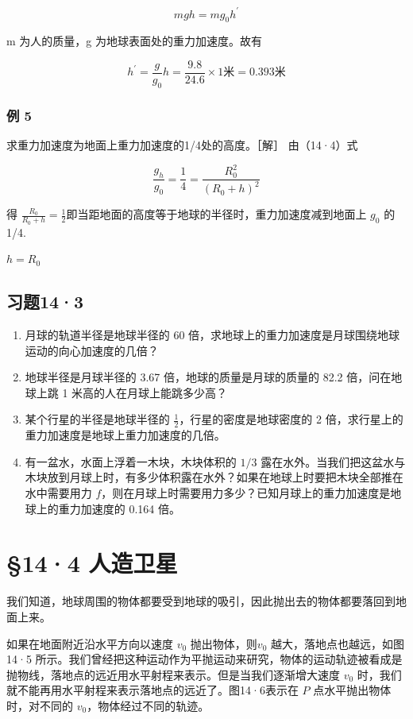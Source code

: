 \[
m g h = m g _ {0} h ^ {\prime}
\]

m 为人的质量，g 为地球表面处的重力加速度。故有

\[
h ^ {\prime} = \frac {g}{g _ {0}} h = \frac {9.8}{24.6} \times 1 \text{米} = 0.393 \text{米}
\]

\subsubsection{例 5}\label{ux4f8b-5-11}

求重力加速度为地面上重力加速度的1/4处的高度。［解］ 由（14·4）式

\[
\frac {g _ {h}}{g _ {0}} = \frac {1}{4} = \frac {R _ {0} ^ {2}}{(R _ {0} + h) ^ {2}}
\]

得
\(\frac{R_0}{R_0 + h} = \frac{1}{2}\)即当距地面的高度等于地球的半径时，重力加速度减到地面上
\(g_{0}\) 的1/4.

\(h = R_{0}\)

\subsection{习题14·3}\label{ux4e60ux9898143}

\begin{enumerate}
\def\labelenumi{\arabic{enumi}.}
\item
  月球的轨道半径是地球半径的 60
  倍，求地球上的重力加速度是月球围绕地球运动的向心加速度的几倍？
\item
  地球半径是月球半径的 3.67 倍，地球的质量是月球的质量的 82.2
  倍，问在地球上跳 1 米高的人在月球上能跳多少高？
\item
  某个行星的半径是地球半径的 \(\frac{1}{2}\)，行星的密度是地球密度的 2
  倍，求行星上的重力加速度是地球上重力加速度的几倍。
\item
  有一盆水，水面上浮着一木块，木块体积的 \(1/3\)
  露在水外。当我们把这盆水与木块放到月球上时，有多少体积露在水外？如果在地球上时要把木块全部推在水中需要用力
  \(f\)，则在月球上时需要用力多少？已知月球上的重力加速度是地球上的重力加速度的
  0.164 倍。
\end{enumerate}

\section{§14·4 人造卫星}\label{ux4ebaux9020ux536bux661f}

我们知道，地球周围的物体都要受到地球的吸引，因此抛出去的物体都要落回到地面上来。

如果在地面附近沿水平方向以速度 \(v_{0}\) 抛出物体，则\(v_{0}\)
越大，落地点也越远，如图 14·5
所示。我们曾经把这种运动作为平抛运动来研究，物体的运动轨迹被看成是抛物线，落地点的远近用水平射程来表示。但是当我们逐渐增大速度
\(v_{0}\) 时，我们就不能再用水平射程来表示落地点的远近了。图14·6表示在
\(P\) 点水平抛出物体时，对不同的 \(v_{0}\)，物体经过不同的轨迹。


